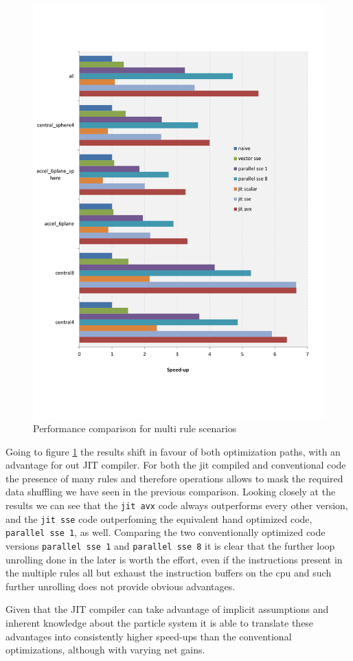 \begin{figure}\centering
  \includegraphics[scale=0.6]{multi_rules.pdf}
  \caption{Performance comparison for multi rule scenarios
  \label{perf_multi}}
\end{figure}

Going to figure \ref{perf_multi} the results shift in favour of both optimization paths, with an advantage for out JIT compiler. For both the jit compiled and conventional code the presence of many rules and therefore operations allows to mask the required data shuffling we have seen in the previous comparison. Looking closely at the results we can see that the \texttt{jit avx} code always outperforms every other version, and the \texttt{jit sse} code outperfoming the equivalent hand optimized code, \texttt{parallel sse 1}, as well. Comparing the two conventionally optimized code versions \texttt{parallel sse 1} and \texttt{parallel sse 8} it is clear that the further loop unrolling done in the later is worth the effort, even if the instructions present in the multiple rules all but exhaust the instruction buffers on the cpu and such further unrolling does not provide obvious advantages.

Given that the JIT compiler can take advantage of implicit assumptions and inherent knowledge about the particle system it is able to translate these advantages into consistently higher speed-ups than the conventional optimizations, although with varying net gains.   



